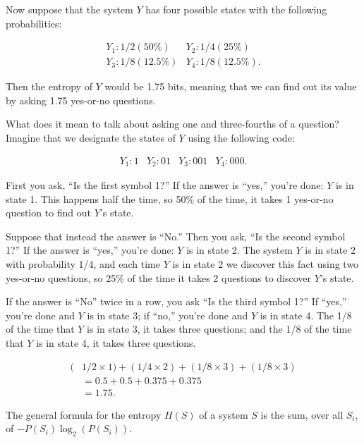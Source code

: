 {
 Now suppose that the system $Y$ has four possible states with the
following probabilities:}

\begin{equation*}
  \begin{array}{ll}
 Y_{1} : 1/2 (50\%) &  Y_{2} : 1/4 (25\%)\\
 Y_{3} : 1/8 (12.5\%) &  Y_{4} : 1/8 (12.5\%).
  \end{array}
\end{equation*}


{
 Then the entropy of $Y$ would be 1.75 bits, meaning that we can find
out its value by asking 1.75 yes-or-no questions.}

{
 What does it mean to talk about asking one and three-fourths of a
question? Imagine that we designate the states of $Y$ using the following
code:}

\begin{equation*}
  \begin{array}{llll}
 Y_{1} : 1 &  Y_{2} : 01 &  Y_{3} : 001 &  Y_{4} : 000.
  \end{array}
\end{equation*}


{
 First you ask, ``Is the first symbol
1?'' If the answer is
``yes,'' you're
done: $Y$ is in state 1. This happens half the time, so 50\% of the time,
it takes 1 yes-or-no question to find out $Y$'s state.}

{
 Suppose that instead the answer is
``No.'' Then you ask,
``Is the second symbol 1?'' If the
answer is ``yes,''
you're done: $Y$ is in state 2. The system $Y$ is in state
2 with probability 1/4, and each time $Y$ is in state 2 we discover this
fact using two yes-or-no questions, so 25\% of the time it takes 2
questions to discover $Y$'s state.}

{
 If the answer is ``No'' twice
in a row, you ask ``Is the third symbol
1?'' If ``yes,''
you're done and $Y$ is in state 3; if
``no,'' you're done
and $Y$ is in state 4. The 1/8 of the time that $Y$ is in state 3, it takes
three questions; and the 1/8 of the time that $Y$ is in state 4, it takes
three questions.}

\begin{align*}
 (&1/2 \times 1) + (1/4 \times 2) + (1/8 \times 3) + (1/8 \times 3) \\
  &= 0.5 + 0.5 + 0.375 + 0.375 \\
 &= 1.75.
\end{align*}

{
 The general formula for the entropy $H(S)$ of a system $S$ is the sum,
over all $S_{i}$, of
$-P(S_{i})\log_{2}(P(S_{i}))$.}

